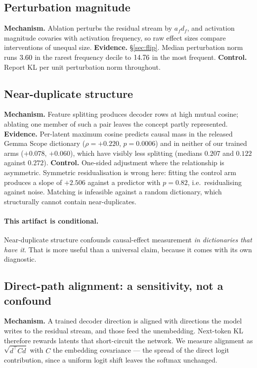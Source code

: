 \documentclass[11pt]{article}
\begin{document}
\subsection{Perturbation magnitude}
\textbf{Mechanism.} Ablation perturbs the residual stream by $a_f d_f$, and
activation magnitude covaries with activation frequency, so raw effect sizes
compare interventions of unequal size. \textbf{Evidence.} \S\ref{sec:flip}.
Median perturbation norm runs $3.60$ in the rarest frequency decile to
$14.76$ in the most frequent. \textbf{Control.} Report KL per unit
perturbation norm throughout.

\subsection{Near-duplicate structure}
\textbf{Mechanism.} Feature splitting produces decoder rows at high mutual
cosine; ablating one member of such a pair leaves the concept partly represented.
\textbf{Evidence.} Per-latent maximum cosine predicts causal mass in the released
Gemma Scope dictionary ($\rho=+0.220$, $p=0.0006$) and in neither of our trained
arms ($+0.078$, $+0.060$), which have visibly less splitting (medians $0.207$ and
$0.122$ against $0.272$). \textbf{Control.} One-sided adjustment where the
relationship is asymmetric. Symmetric residualisation is wrong here: fitting the
control arm produces a slope of $+2.506$ against a predictor with $p=0.82$, i.e.\
residualising against noise. Matching is infeasible against a random dictionary,
which structurally cannot contain near-duplicates.

\paragraph{This artifact is conditional.} Near-duplicate structure confounds
causal-effect measurement \emph{in dictionaries that have it}. That is more
useful than a universal claim, because it comes with its own diagnostic.

\subsection{Direct-path alignment: a sensitivity, not a confound}
\label{sec:align}
\textbf{Mechanism.} A trained decoder direction is aligned with directions the
model writes to the residual stream, and those feed the unembedding. Next-token
KL therefore rewards latents that short-circuit the network. We measure alignment
as $\sqrt{d^\top C d}$ with $C$ the embedding covariance --- the spread of the
direct logit contribution, since a uniform logit shift leaves the softmax
unchanged.
\end{document}
